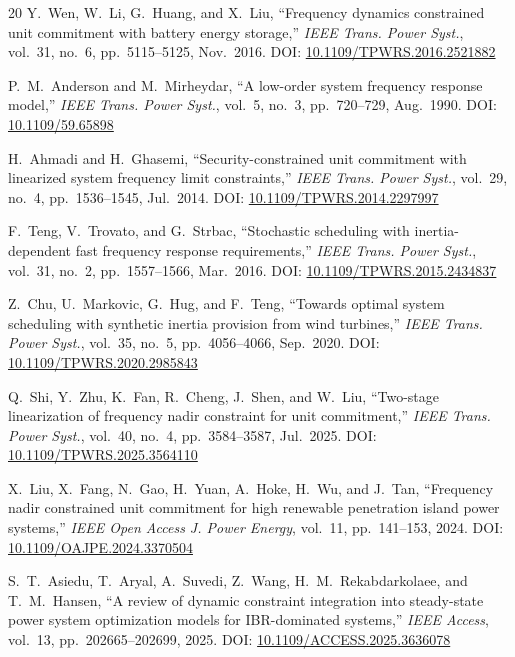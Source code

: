 \documentclass[journal]{IEEEtran}
\begin{document}
\begin{thebibliography}{20}
Y.~Wen, W.~Li, G.~Huang, and X.~Liu,
``Frequency dynamics constrained unit commitment with battery
energy storage,''
\textit{IEEE Trans. Power Syst.},
vol.~31, no.~6, pp.~5115--5125, Nov.~2016.
DOI: \href{https://doi.org/10.1109/TPWRS.2016.2521882}
{10.1109/TPWRS.2016.2521882}

P.~M.~Anderson and M.~Mirheydar,
``A low-order system frequency response model,''
\textit{IEEE Trans. Power Syst.},
vol.~5, no.~3, pp.~720--729, Aug.~1990.
DOI: \href{https://doi.org/10.1109/59.65898}
{10.1109/59.65898}

H.~Ahmadi and H.~Ghasemi,
``Security-constrained unit commitment with linearized system
frequency limit constraints,''
\textit{IEEE Trans. Power Syst.},
vol.~29, no.~4, pp.~1536--1545, Jul.~2014.
DOI: \href{https://doi.org/10.1109/TPWRS.2014.2297997}
{10.1109/TPWRS.2014.2297997}

F.~Teng, V.~Trovato, and G.~Strbac,
``Stochastic scheduling with inertia-dependent fast frequency
response requirements,''
\textit{IEEE Trans. Power Syst.},
vol.~31, no.~2, pp.~1557--1566, Mar.~2016.
DOI: \href{https://doi.org/10.1109/TPWRS.2015.2434837}
{10.1109/TPWRS.2015.2434837}

Z.~Chu, U.~Markovic, G.~Hug, and F.~Teng,
``Towards optimal system scheduling with synthetic inertia
provision from wind turbines,''
\textit{IEEE Trans. Power Syst.},
vol.~35, no.~5, pp.~4056--4066, Sep.~2020.
DOI: \href{https://doi.org/10.1109/TPWRS.2020.2985843}
{10.1109/TPWRS.2020.2985843}

Q.~Shi, Y.~Zhu, K.~Fan, R.~Cheng, J.~Shen, and W.~Liu,
``Two-stage linearization of frequency nadir constraint for
unit commitment,''
\textit{IEEE Trans. Power Syst.},
vol.~40, no.~4, pp.~3584--3587, Jul.~2025.
DOI: \href{https://doi.org/10.1109/TPWRS.2025.3564110}
{10.1109/TPWRS.2025.3564110}

X.~Liu, X.~Fang, N.~Gao, H.~Yuan, A.~Hoke, H.~Wu, and J.~Tan,
``Frequency nadir constrained unit commitment for high renewable
penetration island power systems,''
\textit{IEEE Open Access J. Power Energy},
vol.~11, pp.~141--153, 2024.
DOI: \href{https://doi.org/10.1109/OAJPE.2024.3370504}
{10.1109/OAJPE.2024.3370504}

S.~T.~Asiedu, T.~Aryal, A.~Suvedi, Z.~Wang,
H.~M.~Rekabdarkolaee, and T.~M.~Hansen,
``A review of dynamic constraint integration into steady-state
power system optimization models for IBR-dominated systems,''
\textit{IEEE Access},
vol.~13, pp.~202665--202699, 2025.
DOI: \href{https://doi.org/10.1109/ACCESS.2025.3636078}
{10.1109/ACCESS.2025.3636078}


\end{thebibliography}
\end{document}

